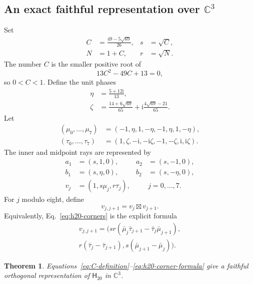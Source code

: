 \documentclass[12pt,a4paper]{article}
\newtheorem{theorem}{Theorem}
\theoremstyle{definition}
\theoremstyle{remark}
\newcommand{\ii}{\mathrm{i}}
\newcommand{\C}{\mathbb C}
\newcommand{\Htwenty}{\mathsf H_{20}}
\begin{document}
\subsection{An exact faithful representation over
\texorpdfstring{$\C^3$}{C3}}

Set
\begin{equation}
 \begin{aligned}
 C&=\frac{49-5\sqrt{69}}{26},&s&=\sqrt C,\\
 N&=1+C,&r&=\sqrt N.
 \end{aligned}
 \label{eq:C-definition}
\end{equation}
The number $C$ is the smaller positive root of
\begin{equation}
 13C^2-49C+13=0,
 \label{eq:C-polynomial}
\end{equation}
so $0<C<1$.  Define the unit phases
\begin{align}
 \eta&=\frac{5+12\ii}{13},\label{eq:eta}\\
 \zeta&=\frac{14+6\sqrt{69}}{65}
 +\ii\frac{4\sqrt{69}-21}{65}.
 \label{eq:zeta}
\end{align}
Let
\begin{align*}
 (\mu_0,\ldots,\mu_7)&=(-1,\eta,1,-\eta,-1,\eta,1,-\eta),\\
 (\tau_0,\ldots,\tau_7)&=(1,\zeta,-\ii,-\ii\zeta,
 -1,-\zeta,\ii,\ii\zeta).
\end{align*}
The inner and midpoint rays are represented by
\begin{align}
 a_1&=(s,1,0),&a_2&=(s,-1,0),\nonumber\\
 b_1&=(s,\eta,0),&b_2&=(s,-\eta,0),
 \label{eq:h20-inner-vectors}\\
 v_j&=(1,s\mu_j,r\tau_j),&&j=0,\ldots,7.
 \label{eq:h20-midpoints}
\end{align}
For $j$ modulo eight, define
\begin{equation}
 v_{j,j+1}=v_j\boxtimes v_{j+1}.
 \label{eq:h20-corners}
\end{equation}
Equivalently, Eq.~\eqref{eq:h20-corners} is the explicit formula
\begin{multline}
 v_{j,j+1}=\bigl(
 sr(\bar\mu_j\bar\tau_{j+1}-\bar\tau_j\bar\mu_{j+1}),\\
 r(\bar\tau_j-\bar\tau_{j+1}),
 s(\bar\mu_{j+1}-\bar\mu_j)\bigr).
 \label{eq:h20-corner-formula}
\end{multline}

\begin{theorem}
\label{thm:h20-complex}
Equations~\eqref{eq:C-definition}--\eqref{eq:h20-corner-formula}
give a faithful orthogonal representation of $\Htwenty$ in $\C^3$.
\end{theorem}
\end{document}
